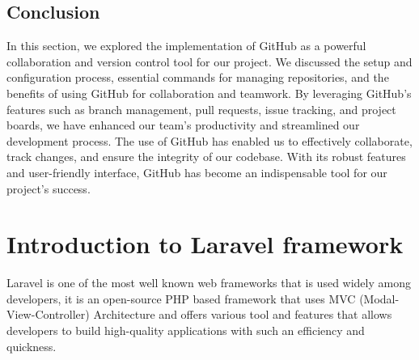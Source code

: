 \subsection{Conclusion}
In this section, we explored the implementation of GitHub as a powerful collaboration and version control tool for our project. We discussed the setup and configuration process, essential commands for managing repositories, and the benefits of using GitHub for collaboration and teamwork. By leveraging GitHub's features such as branch management, pull requests, issue tracking, and project boards, we have enhanced our team's productivity and streamlined our development process. The use of GitHub has enabled us to effectively collaborate, track changes, and ensure the integrity of our codebase. With its robust features and user-friendly interface, GitHub has become an indispensable tool for our project's success.
\newpage
\section{Introduction to Laravel framework}
Laravel is one of the most well known web frameworks that is used widely among developers, it is an open-source PHP based framework that uses MVC (Modal-View-Controller) Architecture and offers various tool and features that allows developers to build high-quality applications with such an efficiency and quickness. 

